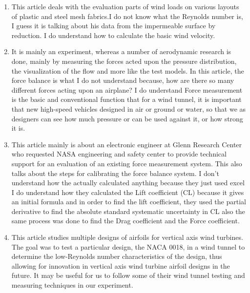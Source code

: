\documentclass[12pt,letterpaper]{article}
\begin{document}
\begin{enumerate}
	\item \cite{Hubova2019} This article deals with the evaluation parts of wind loads on various layouts of plastic and steel mesh fabrics.I do not know what the Reynolds number is, I guess it is talking about his data from the impermeable surface by reduction.
I do understand how to calculate the basic wind velocity.
	\item \cite{Yan2009} It is mainly an experiment, whereas a number of aerodynamic research is done, mainly by measuring the forces acted upon the pressure distribution, the visualization of the flow and more like the test models. 
In this article, the force balance is what I do not understand because, how are there so many different forces acting upon an airplane?
I do understand Force measurement is the basic and conventional function that for a wind tunnel, it is important that new high-speed vehicles designed in air or ground or water, so that we as designers can see how much pressure or can be used against it, or how strong it is.
	\item \cite{robert2012} This article mainly is about an electronic engineer at Glenn Research Center who requested NASA engineering and safety center to provide technical support for an evaluation of an existing force measurement system.
This also talks about the steps for calibrating the force balance system.
I don’t understand how the actually calculated anything because they just used excel
I do understand how they calculated the Lift coefficient (CL) because it gives an initial formula and in order to find the lift coefficient, they used the partial derivative to find the absolute standard systematic uncertainty in  CL also the same process was done to find the Drag coefficient and the Force coefficient.




	
	\item\cite{Rudnicki2004} This article studies multiple designs of airfoils for vertical axis wind turbines. The goal was to test a particular design, the NACA 0018, in a wind tunnel to determine the low-Reynolds number characteristics of the design, thus allowing for innovation in vertical axis wind turbine airfoil designs in the future. It may be useful for us to follow some of their wind tunnel testing and measuring techniques in our experiment.
\end{enumerate}

\printbibliography
\end{document}
